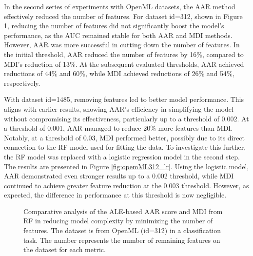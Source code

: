 

In the second series of experiments with OpenML datasets, the AAR method effectively reduced the number of features. For dataset id=312, shown in Figure \ref{fig:opemML312}, reducing the number of features did not significantly boost the model's performance, as the AUC remained stable for both AAR and MDI methods. However, AAR was more successful in cutting down the number of features. In the initial threshold, AAR reduced the number of features by 16\%, compared to MDI's reduction of 13\%. At the subsequent evaluated thresholds, AAR achieved reductions of 44\% and 60\%, while MDI achieved reductions of 26\% and 54\%, respectively.

With dataset id=1485, removing features led to better model performance. This aligns with earlier results, showing AAR's efficiency in simplifying the model without compromising its effectiveness, particularly up to a threshold of 0.002. At a threshold of 0.001, AAR managed to reduce 20\% more features than MDI. Notably, at a threshold of 0.03, MDI performed better,  possibly due to its direct connection to the RF model used for fitting the data. To investigate this further, the RF model was replaced with a logistic regression model in the second step. The results are presented in Figure \ref{fig:opemML312_lr}. Using the logistic model, AAR demonstrated even stronger results up to a 0.002 threshold, while MDI continued to achieve greater feature reduction at the 0.003 threshold. However, as expected, the difference in performance at this threshold is now negligible.


\begin{figure}[ht!]
\centering
  \caption{Comparative analysis of the ALE-based AAR score and MDI from RF in reducing model complexity by minimizing the number of features. The dataset is from OpenML (id=312) in a classification task. The number represents the number of remaining features on the dataset for each metric. }
    \label{fig:opemML312}
\end{figure}


